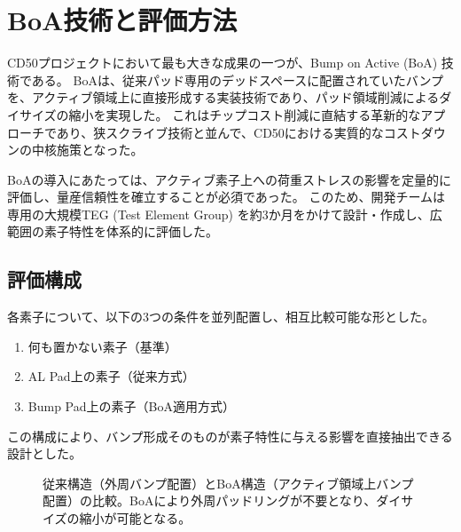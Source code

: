 \documentclass[conference]{IEEEtran}
\begin{document}
\section{BoA技術と評価方法}
CD50プロジェクトにおいて最も大きな成果の一つが、Bump on Active (BoA) 技術である。  
BoAは、従来パッド専用のデッドスペースに配置されていたバンプを、アクティブ領域上に直接形成する実装技術であり、パッド領域削減によるダイサイズの縮小を実現した。  
これはチップコスト削減に直結する革新的なアプローチであり、狭スクライブ技術と並んで、CD50における実質的なコストダウンの中核施策となった。

BoAの導入にあたっては、アクティブ素子上への荷重ストレスの影響を定量的に評価し、量産信頼性を確立することが必須であった。  
このため、開発チームは専用の大規模TEG (Test Element Group) を約3か月をかけて設計・作成し、広範囲の素子特性を体系的に評価した。  

\subsection{評価構成}
各素子について、以下の3つの条件を並列配置し、相互比較可能な形とした。
\begin{enumerate}
  \item 何も置かない素子（基準）
  \item AL Pad上の素子（従来方式）
  \item Bump Pad上の素子（BoA適用方式）
\end{enumerate}
この構成により、バンプ形成そのものが素子特性に与える影響を直接抽出できる設計とした。

\begin{figure}[h]
\centering
{}
\caption{従来構造（外周バンプ配置）とBoA構造（アクティブ領域上バンプ配置）の比較。BoAにより外周パッドリングが不要となり、ダイサイズの縮小が可能となる。}
\end{figure}
\end{document}
